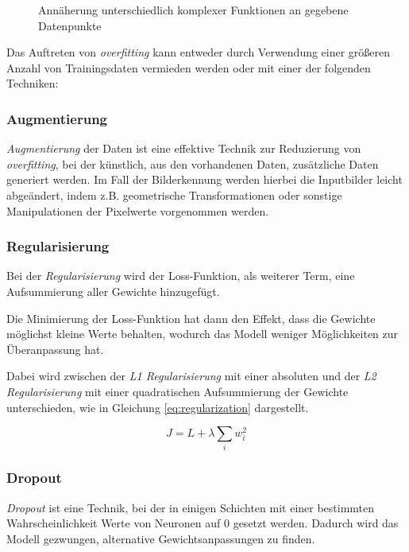 \vspace{1cm}
\begin{figure}[H]
    \centering
    \def\svgwidth{\textwidth}
    
    \caption{Annäherung unterschiedlich komplexer
    Funktionen an gegebene 
        Datenpunkte}
    \label{fig:over_under_fit}
\end{figure}
\vspace{1cm}

Das Auftreten von \textit{\Gls{overfitting}} kann entweder durch 
Verwendung einer größeren Anzahl von Trainingsdaten vermieden werden 
oder mit einer der folgenden Techniken:


\subsubsection{Augmentierung}

\textit{Augmentierung} der Daten ist eine effektive Technik 
zur Reduzierung von \textit{\Gls{overfitting}}, bei der künstlich,
aus den vorhandenen Daten, zusätzliche Daten generiert werden. 
Im Fall der Bilderkennung werden hierbei 
die Inputbilder leicht abgeändert, indem z.B. geometrische 
Transformationen oder sonstige Manipulationen der Pixelwerte 
vorgenommen werden.


\subsubsection{Regularisierung}

Bei der \textit{Regularisierung} wird der Loss-Funktion,
als weiterer Term, eine Aufsummierung aller Gewichte
hinzugefügt.

Die Minimierung der Loss-Funktion hat dann den Effekt, dass
die Gewichte möglichst 
kleine Werte behalten, wodurch das Modell weniger
Möglichkeiten zur Überanpassung hat.

Dabei wird zwischen der \textit{L1 Regularisierung}
mit einer absoluten und der \textit{L2 Regularisierung} mit einer 
quadratischen Aufsummierung der
Gewichte unterschieden, wie in Gleichung \ref{eq:regularization}
dargestellt.

\begin{equation}
    \label{eq:regularization}
    J = L + \lambda \sum_{i} w_{i}^{2}
\end{equation}


\subsubsection{Dropout}
\textit{Dropout} ist eine Technik, bei der in einigen Schichten 
mit einer bestimmten Wahrscheinlichkeit Werte von 
Neuronen auf 0 gesetzt werden.
Dadurch wird das Modell gezwungen, alternative
Gewichtsanpassungen zu finden.

